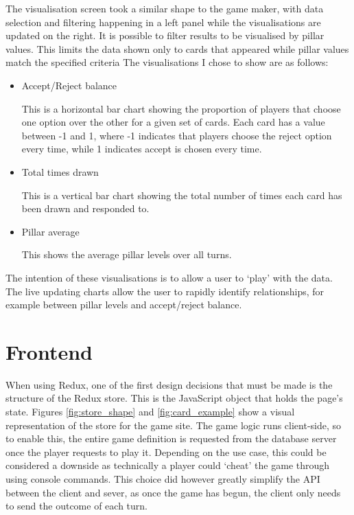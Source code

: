 The visualisation screen took a similar shape to the game maker, with data selection and filtering happening in a left panel while the visualisations are updated on the right.
It is possible to filter results to be visualised by pillar values. This limits the data shown only to cards that appeared while pillar values match the specified criteria The visualisations I chose to show are as follows:
\begin{itemize}
    \item Accept/Reject balance

    This is a horizontal bar chart showing the proportion of players that choose one option over the other for a given set of cards. Each card has a value between -1 and 1, where -1 indicates that players choose the reject option every time, while 1 indicates accept is chosen every time.

    \item Total times drawn
    
    This is a vertical bar chart showing the total number of times each card has been drawn and responded to.
    
    \item Pillar average

    This shows the average pillar levels over all turns.
\end{itemize}

The intention of these visualisations is to allow a user to `play' with the data. The live updating charts allow the user to rapidly identify relationships, for example between pillar levels and accept/reject balance.

\section{Frontend}
When using Redux, one of the first design decisions that must be made is the structure of the Redux store. This is the JavaScript object that holds the page's state. Figures \ref{fig:store_shape} and \ref{fig:card_example} show a visual representation of the store for the game site. The game logic runs client-side, so to enable this, the entire game definition is requested from the database server once the player requests to play it. Depending on the use case, this could be considered a downside as technically a player could `cheat' the game through using console commands. This choice did however greatly simplify the API between the client and sever, as once the game has begun, the client only needs to send the outcome of each turn.

